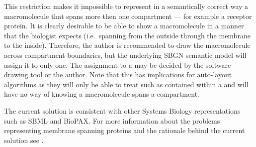 This restriction makes it impossible to represent in a semantically
correct way a macromolecule that spans more then one compartment ---
for example a receptor protein. It is clearly desirable to be able to
show a macromolecule in a manner that the biologist expects (i.e.\,
spanning from the outside through the membrane to the
inside). Therefore, the author is recommended to draw the
macromolecule across compartment boundaries, but the underlying SBGN
semantic model will assign it to only one. The assignment to a
 may be decided by the software drawing tool or the
author. Note that this has implications for auto-layout algorithms as
they will only be able to treat such  as contained within
a  and will have no way of knowing a macromolecule spans a
compartment.

The current solution is consistent with other Systems Biology
representations such as SBML and BioPAX. For more information about the
problems representing membrane spanning proteins and the rationale
behind the current solution see .

